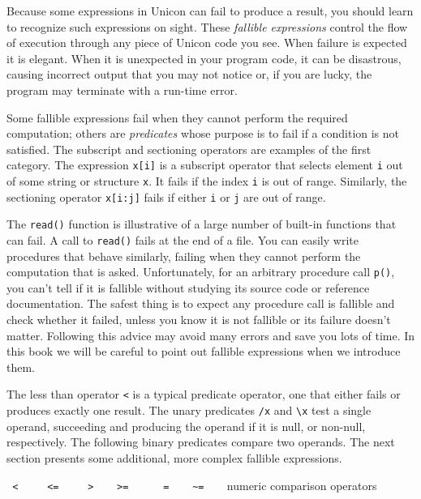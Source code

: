 Because some expressions in Unicon can fail to
produce a result, you should learn to recognize such expressions on
sight. These \textit{fallible
expression}\textit{s} control the flow of execution through any piece
of Unicon code you see. When failure is expected it is elegant. When it
is unexpected in your program code, it can be disastrous, causing
incorrect output that you may not notice or, if you are lucky, the
program may terminate with a run-time error.

Some fallible expressions fail when they cannot perform the required
computation; others are \textit{predicates} whose purpose is to fail if
a condition is not satisfied. The subscript and sectioning operators are examples of the first category. The
expression \texttt{x[i]} is a subscript
operator that selects element \texttt{i} out of some string or
structure \texttt{x}. It fails if the index \texttt{i} is out of range.
Similarly, the sectioning operator \texttt{x[i:j]} fails if either
\texttt{i} or \texttt{j} are out of range.

The \texttt{read()} function is illustrative of a large number of
built-in functions that can fail. A call to \texttt{read()} fails at
the end of a file. You can easily write procedures that behave
similarly, failing when they cannot perform the computation that is
asked. Unfortunately, for an arbitrary procedure call \texttt{p()}, you
can't tell if it is fallible without studying its
source code or reference documentation. The safest
thing is to expect any procedure call is fallible and check whether it
failed, unless you know it is not fallible or its failure
doesn't matter. Following this advice may avoid many
errors and save you lots of time. In this book we will be careful to
point out fallible expressions when we introduce them.

The less than operator \texttt{{\textless}} is a typical predicate
operator, one that either fails or produces exactly one result. The
unary predicates \texttt{/x} and \texttt{{\textbackslash}x} test a single
operand, succeeding and producing the operand if it is null, or
non-null, respectively. The following binary predicates compare two
operands. The next section presents some additional, more complex
fallible expressions.

\bigskip

\texttt{
{\textless} \ \ \ \ {\textless}= \ \ \ \ {\textgreater}
\ \ \ {\textgreater}= \ \ \ \ \ =
\ \ \ \~{}=}\texttt{\ \ }\ \ numeric
comparison operators


